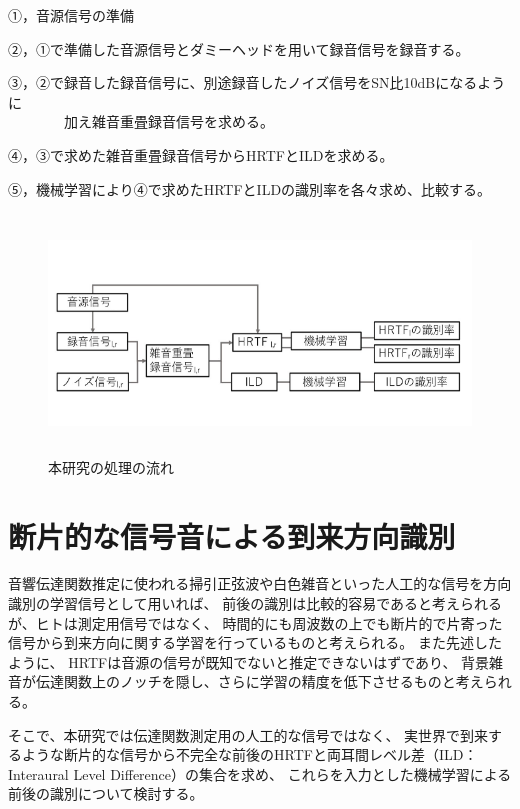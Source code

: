 \documentclass[autodetect-engine,12pt,titlepagedvi=dvipdfmx,ja=standard]{bxjsreport}
\begin{document}
①，音源信号の準備

②，①で準備した音源信号とダミーヘッドを用いて録音信号を録音する。

③，②で録音した録音信号に、別途録音したノイズ信号をSN比10dBになるように\\　　　　加え雑音重畳録音信号を求める。

④，③で求めた雑音重畳録音信号からHRTFとILDを求める。

⑤，機械学習により④で求めたHRTFとILDの識別率を各々求め、比較する。


\begin{figure}[htbp]
  \begin{center}
  \includegraphics[clip, width=5.0in, height = 2.5in]{picture/ProcessFlowOfThisResearch.png}
  \end{center}
  \caption{本研究の処理の流れ}\label{fig:1_1}
\end{figure}

\chapter{断片的な信号音による到来方向識別}
音響伝達関数推定に使われる掃引正弦波や白色雑音といった人工的な信号を方向識別の学習信号として用いれば、
前後の識別は比較的容易であると考えられるが、ヒトは測定用信号ではなく、
時間的にも周波数の上でも断片的で片寄った信号から到来方向に関する学習を行っているものと考えられる。
また先述したように、
HRTFは音源の信号が既知でないと推定できないはずであり、
背景雑音が伝達関数上のノッチを隠し、さらに学習の精度を低下させるものと考えられる。

そこで、本研究では伝達関数測定用の人工的な信号ではなく、
実世界で到来するような断片的な信号から不完全な前後のHRTFと両耳間レベル差（ILD：Interaural Level Difference）の集合を求め、
これらを入力とした機械学習による前後の識別について検討する。
    
\end{document}
